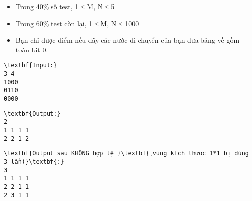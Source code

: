 \begin{itemize}
	\item     Trong 40\% số test, 1 ≤ M, N ≤ 5   
	\item     Trong 60\% test còn lại, 1 ≤ M, N ≤ 1000   
\end{itemize}
\begin{itemize}
	\item     Bạn chỉ được điểm nếu dãy các nước di chuyển của bạn đưa bảng về gồm toàn bit 0.   
\end{itemize}
\begin{verbatim}
\textbf{Input:}
3 4
1000
0110
0000
\end{verbatim}
\begin{verbatim}
\textbf{Output:}
2
1 1 1 1
2 2 1 2
\end{verbatim}
\begin{verbatim}
\textbf{Output sau KHÔNG hợp lệ }\textbf{(vùng kích thước 1*1 bị dùng 3 lần)}\textbf{:}
3
1 1 1 1
2 2 1 1
2 3 1 1
\end{verbatim}